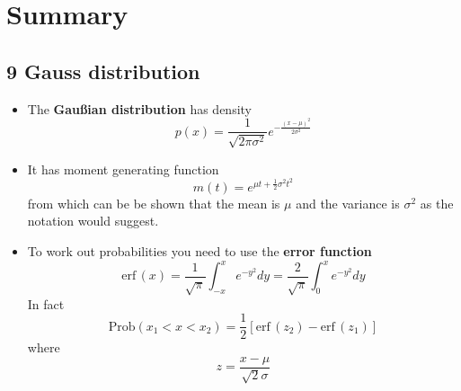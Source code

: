 \ifind
\section*{Summary}
\else
\subsection*{9 Gauss distribution}
\fi

\begin{itemize}

\item The \textbf{Gau\ss{}ian distribution} has density
  \begin{equation}
p(x)=\frac{1}{\sqrt{2\pi\sigma^2}}e^{-\frac{(x-\mu)^2}{2\sigma^2}}
  \end{equation}

\item It has moment generating function
  \begin{equation}
m(t)= e^{\mu t + \frac{1}{2}\sigma^2 t^2}
  \end{equation}
  from which can be be shown that the mean is $\mu$ and the variance is $\sigma^2$ as the notation would suggest.

\item To work out probabilities you need to use the \textbf{error function}
  \begin{equation}
\mbox{erf}\,(x)=\frac{1}{\sqrt{\pi}}\int_{-x}^xe^{-y^2}dy=\frac{2}{\sqrt{\pi}}\int_0^xe^{-y^2}dy
  \end{equation}
  In fact
  \begin{equation}
\mbox{Prob}(x_1<x<x_2)=\frac{1}{2}[\mbox{erf}\,(z_2)-\mbox{erf}\,(z_1)]
  \end{equation}
  where
  \begin{equation}
z=\frac{x-\mu}{\sqrt{2}\sigma}
  \end{equation}
  \end{itemize}
